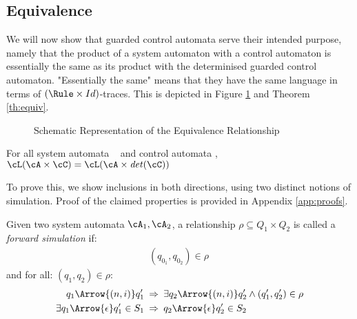 \subsection{Equivalence}
We will now show that guarded control automata serve their intended purpose, namely that the product of a system automaton with a control automaton is essentially the same as its product with the determinised guarded control automaton. "Essentially the same" means that they have the same language in terms of $(\Rule \times Id)$-traces. This is depicted in Figure \ref{fig:equiv} and Theorem \ref{th:equiv}.

\begin{figure}
\centering
{}
\caption{Schematic Representation of the Equivalence Relationship}
\label{fig:equiv}
\end{figure}

\begin{theorem}\label{th:equiv}
For all system automata \cA~ and control automata \cC, $\cL(\cA \times \cC) = \cL(\cA \times \mathit{det}(\cC))$
\end{theorem}
%
To prove this, we show inclusions in both directions, using two distinct notions of simulation. Proof of the claimed properties is provided in Appendix \ref{app:proofs}. 

\begin{definition}\label{def:rho}
Given two system automata $\cA_1, \cA_2$, a relationship $\rho \subseteq Q_1 \times Q_2$ is called a \emph{forward simulation} if:
\begin{align}\label{sim1}
&(q_{0_1}, q_{0_2}) \in \rho \: &
\end{align}
and for all: $(q_1,q_2) \in \rho$:
\begin{align}\label{sim2}
q_1 \Arrow{(n,i)} q_1' \: &\Rightarrow \:
\exists q_2 \Arrow{(n,i)} q_2' \wedge (q_1', q_2') \in \rho\\
\label{sim3}
\exists q_1 \Arrow{\epsilon} q_1' \in S_1 \: &\Rightarrow \:
q_2 \Arrow{\epsilon} q_2' \in S_2
\end{align}
\end{definition}

